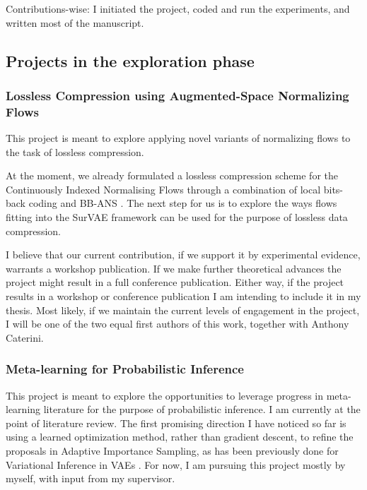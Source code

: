 \documentclass[12pt]{article}
\begin{document}
Contributions-wise: I initiated the project, coded and run the experiments, and written most of the manuscript.



\subsection{Projects in the exploration phase}

\subsubsection{Lossless Compression using Augmented-Space Normalizing Flows}
This project is meant to explore applying novel variants of normalizing flows to the task of lossless compression.

At the moment, we already formulated a lossless compression scheme for the Continuously Indexed Normalising Flows \citep{Cornish2020cif} through a combination of local bits-back coding \citep{Ho2019local} and BB-ANS \citep{Townsend2019bbans}.
The next step for us is to explore the ways flows fitting into the SurVAE framework \citep{Nielsen2020survae} can be used for the purpose of lossless data compression.

I believe that our current contribution, if we support it by experimental evidence, warrants a workshop publication.
If we make further theoretical advances the project might result in a full conference publication.
Either way, if the project results in a workshop or conference publication I am intending to include it in my thesis.
Most likely, if we maintain the current levels of engagement in the project, I will be one of the two equal first authors of this work, together with Anthony Caterini.

\subsubsection{Meta-learning for Probabilistic Inference}
This project is meant to explore the opportunities to leverage progress in meta-learning literature for the purpose of probabilistic inference.
I am currently at the point of literature review.
The first promising direction I have noticed so far is using a learned optimization method, rather than gradient descent, to refine the proposals in Adaptive Importance Sampling, as has been previously done for Variational Inference in VAEs \citep{Marino2018iterative}.
For now, I am pursuing this project mostly by myself, with input from my supervisor.
\end{document}
